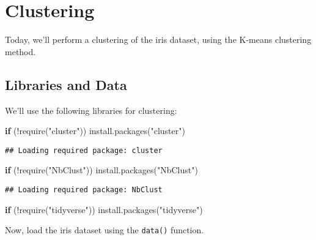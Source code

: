 \documentclass[
]{book}
\newenvironment{Shaded}{\begin{snugshade}}{\end{snugshade}}
\newcommand{\ControlFlowTok}[1]{\textcolor[rgb]{0.13,0.29,0.53}{\textbf{#1}}}
\newcommand{\FunctionTok}[1]{\textcolor[rgb]{0.00,0.00,0.00}{#1}}
\newcommand{\NormalTok}[1]{#1}
\newcommand{\SpecialCharTok}[1]{\textcolor[rgb]{0.00,0.00,0.00}{#1}}
\newcommand{\StringTok}[1]{\textcolor[rgb]{0.31,0.60,0.02}{#1}}
\begin{document}
\hypertarget{clustering}{%
\chapter{Clustering}\label{clustering}}

Today, we'll perform a clustering of the iris dataset, using the K-means clustering method.

\hypertarget{libraries-and-data-1}{%
\section{Libraries and Data}\label{libraries-and-data-1}}

We'll use the following libraries for clustering:

\begin{Shaded}
\begin{Highlighting}[]
\ControlFlowTok{if}\NormalTok{ (}\SpecialCharTok{!}\FunctionTok{require}\NormalTok{(}\StringTok{"cluster"}\NormalTok{)) }\FunctionTok{install.packages}\NormalTok{(}\StringTok{"cluster"}\NormalTok{)}
\end{Highlighting}
\end{Shaded}

\begin{verbatim}
## Loading required package: cluster
\end{verbatim}

\begin{Shaded}
\begin{Highlighting}[]
\ControlFlowTok{if}\NormalTok{ (}\SpecialCharTok{!}\FunctionTok{require}\NormalTok{(}\StringTok{"NbClust"}\NormalTok{)) }\FunctionTok{install.packages}\NormalTok{(}\StringTok{"NbClust"}\NormalTok{)}
\end{Highlighting}
\end{Shaded}

\begin{verbatim}
## Loading required package: NbClust
\end{verbatim}

\begin{Shaded}
\begin{Highlighting}[]
\ControlFlowTok{if}\NormalTok{ (}\SpecialCharTok{!}\FunctionTok{require}\NormalTok{(}\StringTok{"tidyverse"}\NormalTok{)) }\FunctionTok{install.packages}\NormalTok{(}\StringTok{"tidyverse"}\NormalTok{)}
\end{Highlighting}
\end{Shaded}

Now, load the iris dataset using the \texttt{data()} function.
\end{document}
